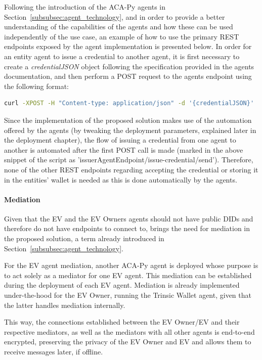 Following the introduction of the ACA-Py agents in Section~\ref{subsubsec:agent_technology}, and in order to provide a better understanding of the capabilities of the agents and how these can be used independently of the use case, an example of how to use the primary REST endpoints exposed by the agent implementation is presented below. 
In order for an entity agent to issue a credential to another agent, it is first necessary to create a \textit{credentialJSON} object following the specification provided in the agents documentation, and then perform a POST request to the agents endpoint using the following format:

\begin{lstlisting}[language=Bash]
    curl -XPOST -H "Content-type: application/json" -d '{credentialJSON}' 'issuerAgentEndpoint/issue-credential/send'
\end{lstlisting}

Since the implementation of the proposed solution makes use of the automation offered by the agents (by tweaking the deployment parameters, explained later in the deployment chapter), the flow of issuing a credential from one agent to another is automated after the first POST call is made (marked in the above snippet of the script as 'issuerAgentEndpoint/issue-credential/send'). Therefore, none of the other REST endpoints regarding accepting the credential or storing it in the entities' wallet is needed as this is done automatically by the agents.

\paragraph{Mediation}

Given that the EV and the EV Owners agents should not have public DIDs and therefore do not have endpoints to connect to, brings the need for mediation in the proposed solution, a term already introduced in Section~\ref{subsubsec:agent_technology}. 

For the EV agent mediation, another ACA-Py agent is deployed whose purpose is to act solely as a mediator for one EV agent. This mediation can be established during the deployment of each EV agent. Mediation is already implemented under-the-hood for the EV Owner, running the Trinsic Wallet agent, given that the latter handles mediation internally. 

This way, the connections established between the EV Owner/EV and their respective mediators, as well as the mediators with all other agents is end-to-end encrypted, preserving the privacy of the EV Owner and EV and allows them to receive messages later, if offline.

